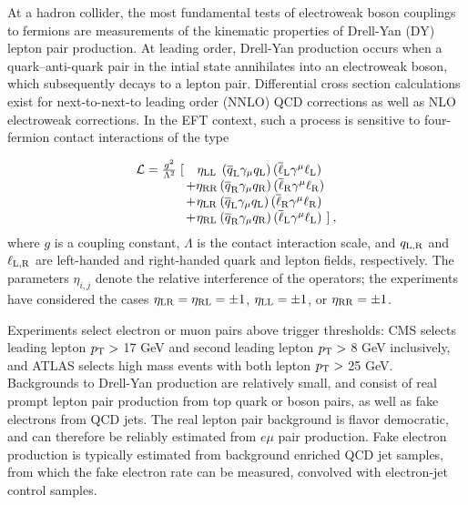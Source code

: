 At a hadron collider, the most fundamental tests of electroweak boson couplings
to fermions are measurements of the kinematic properties of Drell-Yan (DY)
lepton pair production.  At leading order, Drell-Yan production occurs when a
quark--anti-quark pair in the intial state annihilates into an electroweak
boson, which subsequently decays to a lepton pair. Differential cross section
calculations exist for next-to-next-to leading order (NNLO) QCD corrections as
well as NLO electroweak corrections. In the EFT context, such a
process is sensitive to four-fermion contact interactions of the type

\begin{equation}\label{lagrangian}
\begin{array}{r@{\,}c@{}c@{\,}l@{\,}l}
\mathcal L = \frac{g^2}{\Lambda^2}\;[ && \eta_{\rm LL}&\, (\overline q_{\rm L}\gamma_{\mu} q_{\rm L})\,(\overline\ell_{\rm L}\gamma^{\mu}\ell_{\rm L}) \nonumber \\
& +&\eta_{\rm RR}& (\overline q_{\rm R}\gamma_{\mu} q_{\rm R}) \,(\overline\ell_{\rm R}\gamma^{\mu}\ell_{\rm R}) \\
&+&\eta_{\rm LR}& (\overline q_{\rm L}\gamma_{\mu} q_{\rm L}) \,(\overline\ell_{\rm R}\gamma^{\mu}\ell_{\rm R}) \\
&+&\eta_{\rm RL}& (\overline q_{\rm R}\gamma_{\mu} q_{\rm R}) \,(\overline\ell_{\rm L}\gamma^{\mu}\ell_{\rm L})& ] \: ,\nonumber
\end{array}
\end{equation}
where $g$ is a coupling constant, $\Lambda$ is the contact interaction scale,
and $q_{\rm L,R}$ and $\ell_{\rm L,R}$ are left-handed and right-handed quark and
lepton fields, respectively. The parameters $\eta_{i,j}$ denote the relative interference of the operators;
the experiments have considered the cases $\eta_{\rm LR} = \eta_{\rm RL} = \pm 1$,
$\eta_{\rm LL} = \pm 1$, or $\eta_{\rm RR} = \pm 1$.

Experiments select electron or muon pairs above trigger thresholds: CMS selects
leading lepton $p_{\mathrm{T}} >$ 17 GeV and second leading lepton $p_{\mathrm{T}} >$ 8 GeV inclusively,
and ATLAS selects high mass events with both lepton $p_{\mathrm{T}} >$ 25 GeV.  Backgrounds to Drell-Yan production
are relatively small, and consist of real prompt lepton pair production from top quark or boson pairs,
as well as fake electrons from QCD jets.  The real lepton pair background is flavor democratic,
and can therefore be reliably estimated from $e\mu$ pair production.  Fake electron production
is typically estimated from background enriched QCD jet samples, from which the fake electron rate can be measured,
convolved with electron-jet control samples.

